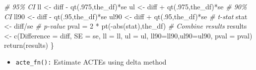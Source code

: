 \documentclass[
]{article}
\newenvironment{Shaded}{\begin{snugshade}}{\end{snugshade}}
\newcommand{\AttributeTok}[1]{\textcolor[rgb]{0.77,0.63,0.00}{#1}}
\newcommand{\CommentTok}[1]{\textcolor[rgb]{0.56,0.35,0.01}{\textit{#1}}}
\newcommand{\DecValTok}[1]{\textcolor[rgb]{0.00,0.00,0.81}{#1}}
\newcommand{\FunctionTok}[1]{\textcolor[rgb]{0.00,0.00,0.00}{#1}}
\newcommand{\NormalTok}[1]{#1}
\newcommand{\OtherTok}[1]{\textcolor[rgb]{0.56,0.35,0.01}{#1}}
\newcommand{\SpecialCharTok}[1]{\textcolor[rgb]{0.00,0.00,0.00}{#1}}
\providecommand{\tightlist}{%
  \setlength{\itemsep}{0pt}\setlength{\parskip}{0pt}}
\begin{document}
\begin{Shaded}
\begin{Highlighting}[]
  \CommentTok{\# 95\% CI}
\NormalTok{  ll }\OtherTok{\textless{}{-}}\NormalTok{ diff }\SpecialCharTok{{-}} \FunctionTok{qt}\NormalTok{(.}\DecValTok{975}\NormalTok{,the\_df)}\SpecialCharTok{*}\NormalTok{se}
\NormalTok{  ul }\OtherTok{\textless{}{-}}\NormalTok{ diff }\SpecialCharTok{+} \FunctionTok{qt}\NormalTok{(.}\DecValTok{975}\NormalTok{,the\_df)}\SpecialCharTok{*}\NormalTok{se}
  \CommentTok{\# 90\% CI}
\NormalTok{  ll90 }\OtherTok{\textless{}{-}}\NormalTok{ diff }\SpecialCharTok{{-}} \FunctionTok{qt}\NormalTok{(.}\DecValTok{95}\NormalTok{,the\_df)}\SpecialCharTok{*}\NormalTok{se}
\NormalTok{  ul90 }\OtherTok{\textless{}{-}}\NormalTok{ diff }\SpecialCharTok{+} \FunctionTok{qt}\NormalTok{(.}\DecValTok{95}\NormalTok{,the\_df)}\SpecialCharTok{*}\NormalTok{se}
  \CommentTok{\# t{-}stat}
\NormalTok{  stat }\OtherTok{\textless{}{-}}\NormalTok{ diff}\SpecialCharTok{/}\NormalTok{se}
  \CommentTok{\# p{-}value}
\NormalTok{  pval }\OtherTok{=} \DecValTok{2} \SpecialCharTok{*} \FunctionTok{pt}\NormalTok{(}\SpecialCharTok{{-}}\FunctionTok{abs}\NormalTok{(stat),the\_df)}
  \CommentTok{\# Combine results}
\NormalTok{  results }\OtherTok{\textless{}{-}} \FunctionTok{c}\NormalTok{(}\AttributeTok{Difference =}\NormalTok{ diff, }\AttributeTok{SE =}\NormalTok{ se, }\AttributeTok{ll =}\NormalTok{ ll, }\AttributeTok{ul =}\NormalTok{ ul,}
               \AttributeTok{ll90=}\NormalTok{ll90,}\AttributeTok{ul90=}\NormalTok{ul90, }\AttributeTok{pval =}\NormalTok{ pval)}
  \FunctionTok{return}\NormalTok{(results)}
\NormalTok{\}}
\end{Highlighting}
\end{Shaded}

\begin{itemize}
\tightlist
\item
  \texttt{acte\_fn():} Estimate ACTEs using delta method
\end{itemize}
\end{document}
